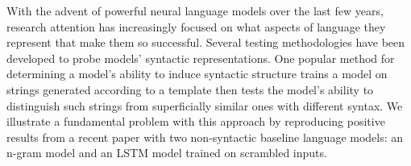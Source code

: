 With the advent of powerful neural language models over the last few years, research attention has increasingly focused on what aspects of language they represent that make them so successful. Several testing methodologies have been developed to probe models' syntactic representations. One popular method for determining a model's ability to induce syntactic structure trains a model on strings generated according to a template then tests the model's ability to distinguish such strings from superficially similar ones with different syntax. We illustrate a fundamental problem with this approach by reproducing positive results from a recent paper with two non-syntactic baseline language models: an n-gram model and an LSTM model trained on scrambled inputs.

